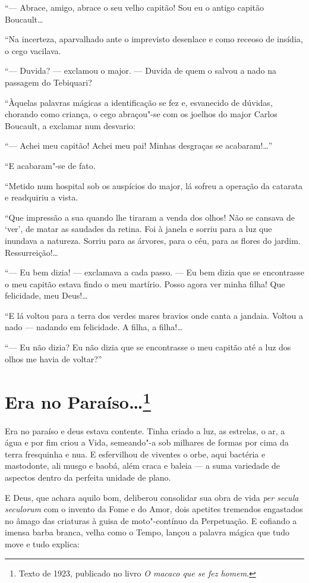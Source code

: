 ``--- Abrace, amigo, abrace o seu velho capitão! Sou eu o antigo capitão
Boucault\ldots{}

``Na incerteza, aparvalhado ante o imprevisto desenlace e como receoso
de insídia, o cego vacilava.

``--- Duvida? --- exclamou o major. --- Duvida de quem o salvou a nado
na passagem do Tebiquari?

``Àquelas palavras mágicas a identificação se fez e, esvanecido de
dúvidas, chorando como criança, o cego abraçou"-se com os joelhos do
major Carlos Boucault, a exclamar num desvario:

``--- Achei meu capitão! Achei meu pai! Minhas desgraças se
acabaram!\ldots{}''

``E acabaram"-se de fato.

``Metido num hospital sob os auspícios do major, lá sofreu a operação da
catarata e readquiriu a vista.

``Que impressão a sua quando lhe tiraram a venda dos olhos! Não se
cansava de `ver', de matar as saudades da retina. Foi à janela e sorriu
para a luz que inundava a natureza. Sorriu para as árvores, para o céu,
para as flores do jardim. Ressurreição!\ldots{}

``--- Eu bem dizia! --- exclamava a cada passo. --- Eu bem dizia que se
encontrasse o meu capitão estava findo o meu martírio. Posso agora ver
minha filha! Que felicidade, meu Deus!\ldots{}

``E lá voltou para a terra dos verdes mares bravios onde canta a
jandaia. Voltou a nado --- nadando em felicidade. A filha, a filha!\ldots{}

``--- Eu não dizia? Eu não dizia que se encontrasse o meu capitão até a
luz dos olhos me havia de voltar?''

\chapter{Era no Paraíso\ldots{}\footnote[*]{Texto de 1923, publicado no livro \emph{O macaco que se fez homem}.}}

Era no paraíso e deus estava contente. Tinha criado a luz, as estrelas,
o ar, a água e por fim criou a Vida, semeando"-a sob milhares de formas
por cima da terra fresquinha e nua. E esfervilhou de viventes o orbe,
aqui bactéria e mastodonte, ali musgo e baobá, além craca e baleia --- a
suma variedade de aspectos dentro da perfeita unidade de plano.

E Deus, que achara aquilo bom, deliberou consolidar sua obra de vida
\emph{per secula seculorum} com o invento da Fome e do Amor, dois
apetites tremendos engastados no âmago das criaturas à guisa de
moto"-contínuo da Perpetuação. E cofiando a imensa barba branca, velha
como o Tempo, lançou a palavra mágica que tudo move e tudo explica:

